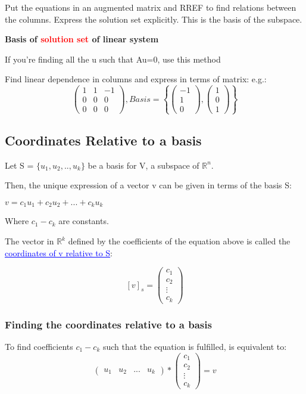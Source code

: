 \documentclass{article}
\newcommand{\bul}[1]{\textcolor{blue}{\underline{#1}}}
\newcommand{\sub}[1]{\vspace{10pt}\textbf{#1}}
\begin{document}
Put the equations in an augmented matrix and RREF to find relations between the columns. Express the solution set explicitly. This is the basis of the subspace.

\sub{Basis of \textcolor{red}{solution set} of linear system}

If you're finding all the u such that Au=0, use this method

Find linear dependence in columns and express in terms of matrix:
e.g.:
\[
\begin{pmatrix}
    1 & 1 & -1\\
    0&0&0\\
    0&0&0
\end{pmatrix}, Basis = \left\{
    \begin{pmatrix}
        -1 \\
        1\\
        0
    \end{pmatrix},
    \begin{pmatrix}
        1\\
        0\\
        1
    \end{pmatrix}
    \right\}
\]


\subsection{Coordinates Relative to a basis}
Let S = $\{u_1,u_2,..,u_k\}$ be a basis for V, a subspace of $\mathbb{R}^n$.

Then, the unique expression of a vector v can be given in terms of the basis S:
\begin{center}
    $v = c_1u_1 + c_2u_2 + ... + c_ku_k$
\end{center}
Where $c_1 - c_k$ are constants.

The vector in $\mathbb{R}^k$ defined by the coefficients of the equation above is called the \bul{coordinates of v relative to S}:

\begin{center}
    \[
    [v]_s = \begin{pmatrix}
        c_1\\
        c_2\\
        \vdots\\
        c_k
    \end{pmatrix}
    \]
\end{center}

\subsubsection{Finding the coordinates relative to a basis}
To find coefficients $c_1 - c_k$ such that the equation is fulfilled, is equivalent to:
\[
\begin{pmatrix}
    u_1 & u_2 & ... & u_k
\end{pmatrix} *
\begin{pmatrix}
    c_1\\
    c_2\\
    \vdots\\
    c_k
\end{pmatrix} =
v
\]
\end{document}
